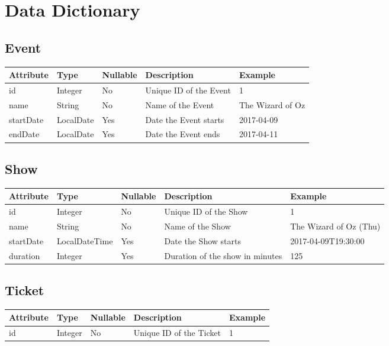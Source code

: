 \chapter{Data Dictionary}

\section{Event}
\keepXColumns
\begin{tabularx}{\textwidth}{l l l X l}
  \textbf{Attribute}&\textbf{Type}&\textbf{Nullable}&\textbf{Description}&\textbf{Example}\\
  \endhead
  id        & Integer   & No  & Unique ID of the Event  & 1\\
  name      & String    & No  & Name of the Event       & The Wizard of Oz\\
  startDate & LocalDate & Yes & Date the Event starts   & 2017-04-09\\
  endDate   & LocalDate & Yes & Date the Event ends     & 2017-04-11\\
\end{tabularx}

\section{Show}
\keepXColumns
\begin{tabularx}{\textwidth}{l l l X l}
  \textbf{Attribute}&\textbf{Type}&\textbf{Nullable}&\textbf{Description}&\textbf{Example}\\
  \endhead
  id        & Integer       & No  & Unique ID of the Show           & 1\\
  name      & String        & No  & Name of the Show                & The Wizard of Oz (Thu)\\
  startDate & LocalDateTime & Yes & Date the Show starts            & 2017-04-09T19:30:00\\
  duration  & Integer       & Yes & Duration of the show in minutes & 125\\
\end{tabularx}

\section{Ticket}
\keepXColumns
\begin{tabularx}{\textwidth}{l l l X l}
  \textbf{Attribute}&\textbf{Type}&\textbf{Nullable}&\textbf{Description}&\textbf{Example}\\
  \endhead
  id & Integer & No & Unique ID of the Ticket & 1\\
\end{tabularx}

